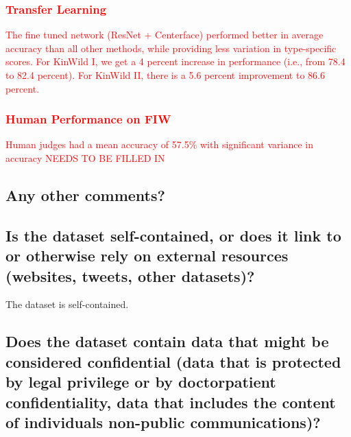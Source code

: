 \subsubsection*{\textcolor{red}{Transfer Learning}}
\textcolor{red}{
The fine tuned network (ResNet + Centerface) performed better in average accuracy than all other methods, while providing less variation in type-specific scores. For KinWild I, we get a 4 percent increase in performance (i.e., from 78.4 to 82.4 percent). For KinWild II, there is a 5.6 percent improvement to 86.6 percent.
}

\subsubsection*{\textcolor{red}{Human Performance on FIW}}
\textcolor{red}{
Human judges had a mean accuracy of 57.5\% with significant variance in accuracy 
NEEDS TO BE FILLED IN
}



\subsection*{Any other comments?}

\subsection*{Is the dataset self-contained, or does it link to or otherwise rely on external resources (\eg websites, tweets, other datasets)?}
\noindent The dataset is self-contained.

\subsection*{Does the dataset contain data that might be considered confidential (\eg data that is protected by legal privilege or by doctorpatient confidentiality, data that includes the content of individuals non-public communications)?}


